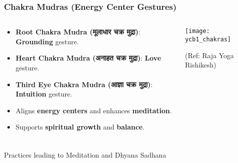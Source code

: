 \begin{frame}[fragile]\frametitle{Chakra Mudras (Energy Center Gestures)}
\begin{columns}
    \begin{column}[T]{0.5\linewidth}
      \begin{itemize}
        \item \textbf{Root Chakra Mudra (मूलाधार चक्र मुद्रा)}: \textbf{Grounding} gesture.
        \item \textbf{Heart Chakra Mudra (अनाहत चक्र मुद्रा)}: \textbf{Love} gesture.
        \item \textbf{Third Eye Chakra Mudra (आज्ञा चक्र मुद्रा)}: \textbf{Intuition} gesture.
        \item Aligns \textbf{energy centers} and enhances \textbf{meditation}.
        \item Supports \textbf{spiritual growth} and \textbf{balance}.
      \end{itemize}
    \end{column}
    \begin{column}[T]{0.5\linewidth}
        \begin{center}
        \texttt{[image: ycb1\_chakras]}
				
		{\tiny (Ref: Raja Yoga Rishikesh)}	 
        \end{center}	
    \end{column}
\end{columns}
\end{frame}



\begin{frame}[fragile]\frametitle{}
\begin{center}
{\Large Practices leading to Meditation and Dhyana Sadhana }
\end{center}
\end{frame}

